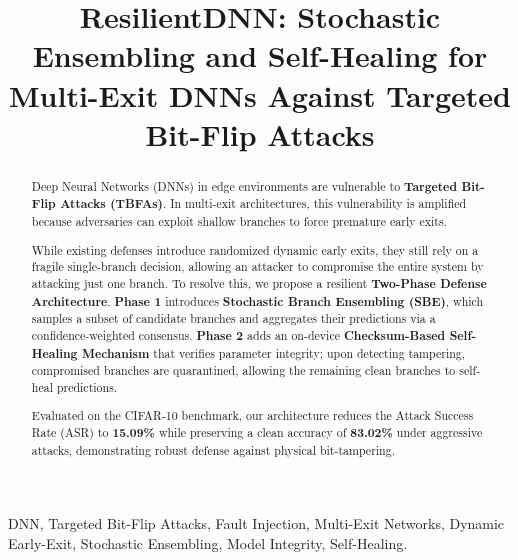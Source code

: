 \documentclass[conference,10pt]{IEEEtran}
\title{ResilientDNN: Stochastic Ensembling and Self-Healing for Multi-Exit DNNs Against Targeted Bit-Flip Attacks}
\begin{document}
\maketitle

\begin{abstract}
Deep Neural Networks (DNNs) in edge environments are vulnerable to \textbf{Targeted Bit-Flip Attacks (TBFAs)}. In multi-exit architectures, this vulnerability is amplified because adversaries can exploit shallow branches to force premature early exits.

While existing defenses introduce randomized dynamic early exits, they still rely on a fragile single-branch decision, allowing an attacker to compromise the entire system by attacking just one branch. To resolve this, we propose a resilient \textbf{Two-Phase Defense Architecture}. \textbf{Phase 1} introduces \textbf{Stochastic Branch Ensembling (SBE)}, which samples a subset of candidate branches and aggregates their predictions via a confidence-weighted consensus. \textbf{Phase 2} adds an on-device \textbf{Checksum-Based Self-Healing Mechanism} that verifies parameter integrity; upon detecting tampering, compromised branches are quarantined, allowing the remaining clean branches to self-heal predictions.

Evaluated on the CIFAR-10 benchmark, our architecture reduces the Attack Success Rate (ASR) to \textbf{15.09\%} while preserving a clean accuracy of \textbf{83.02\%} under aggressive attacks, demonstrating robust defense against physical bit-tampering.
\end{abstract}

\begin{IEEEkeywords}
DNN, Targeted Bit-Flip Attacks, Fault Injection, Multi-Exit Networks, Dynamic Early-Exit, Stochastic Ensembling, Model Integrity, Self-Healing.
\end{IEEEkeywords}


\end{document}
